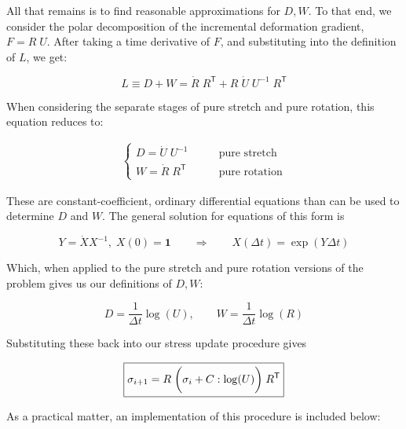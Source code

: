 All that remains is to find reasonable approximations for $D, W$. To that end, we
consider the polar decomposition of the incremental deformation gradient, 
$F = R \; U$. After taking a time derivative of $F$, and substituting into the
definition of $L$, we get:

$$ L \equiv D + W = \dot{R} \; R^{\mathsf{T}} + R \; \dot{U} \; U^{-1} \; R^{\mathsf{T}} $$

When considering the separate stages of pure stretch and pure rotation, this
equation reduces to:

\begin{align*}
\begin{cases}
D = \dot{U} \; U^{-1} & \qquad \text{pure stretch} \\
W = \dot{R} \; R^{\mathsf{T}} & \qquad \text{pure rotation}
\end{cases}
\end{align*}

These are constant-coefficient, ordinary differential equations
than can be used to determine $D$ and $W$. The
general solution for equations of this form is

$$ 
Y = \dot{X} X^{-1}, \; X(0) = \mathbf{1} 
\qquad 
\Longrightarrow 
\qquad 
X(\Delta t) = \exp(Y \Delta t)
$$

Which, when applied to the pure stretch and pure rotation versions of the problem
gives us our definitions of $D, W$:

$$ D = \frac{1}{\Delta t} \log(U), \qquad W = \frac{1}{\Delta t} \log(R) $$

Substituting these back into our stress update procedure gives 

$$\boxed{\sigma_{i+1} = R \; \displaystyle \bigg( \sigma_i + C : \log(U) \bigg) \; R^{\mathsf{T}}}$$

As a practical matter, an implementation of this procedure is included below:



